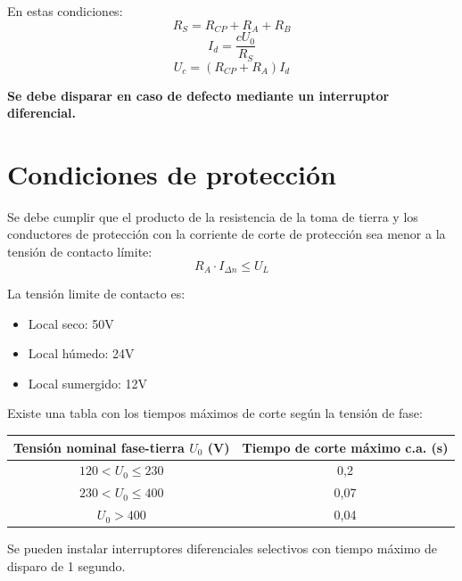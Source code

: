 En estas condiciones:
\begin{equation}
	R_S=R_{CP}+R_A+R_B
\end{equation}
\begin{equation}
	I_d=\dfrac{c U_0}{R_S}
\end{equation}
\begin{equation}
	U_c=\left(R_{CP}+R_A\right)I_d
\end{equation}

\textbf{Se debe disparar en caso de defecto mediante un interruptor diferencial.}
\section{Condiciones de protección}
Se debe cumplir que el producto de la resistencia de la toma de tierra y los conductores de protección con la corriente de corte de protección sea menor a la tensión de contacto límite:
\begin{equation}
	R_A \cdot  I_{\Delta n} \le U_L
\end{equation}

La tensión limite de contacto es:
\begin{itemize}
	\item Local seco: 50V
	\item Local húmedo: 24V
	\item Local sumergido: 12V
\end{itemize}

Existe una tabla con los tiempos máximos de corte según la tensión de fase:
\begin{table}[H]
	\centering
	\begin{tabular}{|c|c|}
		\hline
		\textbf{Tensión nominal fase-tierra $U_0$ (V)} & \textbf{Tiempo de corte máximo c.a. (s)} \\ \hline
		$120 < U_0 \leq 230$ & 0,2 \\ \hline
		$230 < U_0 \leq 400$ & 0,07 \\ \hline
		$U_0 > 400$ & 0,04 \\ \hline
	\end{tabular}
	\label{tabla:tension_tiempo_corte}
\end{table}

Se pueden instalar interruptores diferenciales selectivos con tiempo máximo de disparo de 1 segundo.
